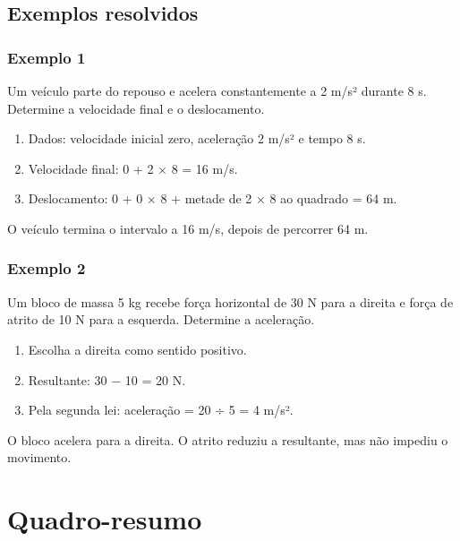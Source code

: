 \documentclass[11pt,a4paper]{article}
\begin{document}
\subsection*{Exemplos resolvidos}

\subsubsection*{Exemplo 1}

Um veículo parte do repouso e acelera constantemente a 2 m/s² durante 8 s. Determine a velocidade final e o deslocamento.

\begin{enumerate}
  \item Dados: velocidade inicial zero, aceleração 2 m/s² e tempo 8 s.
  \item Velocidade final: 0 + 2 × 8 = 16 m/s.
  \item Deslocamento: 0 + 0 × 8 + metade de 2 × 8 ao quadrado = 64 m.
\end{enumerate}

O veículo termina o intervalo a 16 m/s, depois de percorrer 64 m.

\subsubsection*{Exemplo 2}

Um bloco de massa 5 kg recebe força horizontal de 30 N para a direita e força de atrito de 10 N para a esquerda. Determine a aceleração.

\begin{enumerate}
  \item Escolha a direita como sentido positivo.
  \item Resultante: 30 − 10 = 20 N.
  \item Pela segunda lei: aceleração = 20 ÷ 5 = 4 m/s².
\end{enumerate}

O bloco acelera para a direita. O atrito reduziu a resultante, mas não impediu o movimento.

\section*{Quadro-resumo}
\end{document}
